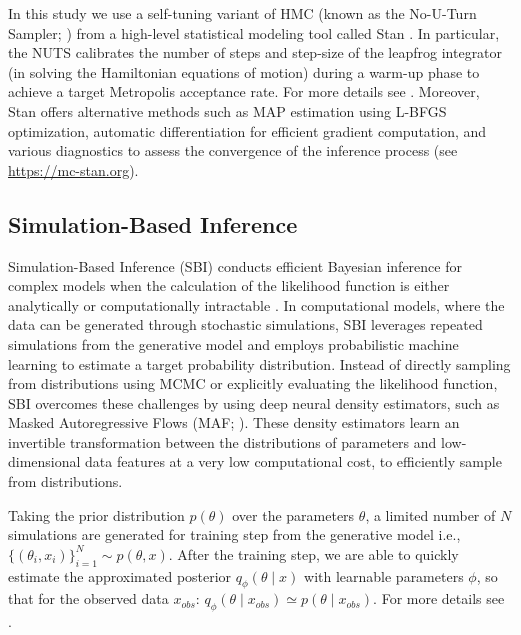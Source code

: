 \documentclass[preprint,11pt,authoryear]{elsarticle}
\begin{document}
In this study we use a self-tuning variant of HMC (known as the No-U-Turn Sampler; \cite{Hoffman2014}) from a high-level statistical modeling tool called Stan \citep{Carpenter2017}.
In particular, the NUTS calibrates the number of steps and step-size of the leapfrog integrator (in solving the Hamiltonian equations of motion) during a warm-up phase to achieve a target Metropolis acceptance rate. For more details see \cite{Betancourt2013, Baldy2023}. Moreover, Stan offers alternative methods such as MAP estimation using L-BFGS optimization, automatic differentiation for efficient gradient computation, and various diagnostics to assess the convergence of the inference process (see \url{https://mc-stan.org}). 



\subsection{Simulation-Based Inference}

Simulation-Based Inference (SBI) conducts efficient Bayesian inference for complex models when the calculation of the likelihood function is either analytically or computationally intractable \citep{Cranmer2020, Brehmer2021}.
In computational models, where the data can be generated through stochastic simulations, SBI leverages repeated simulations from the generative model and employs probabilistic machine learning to estimate a target probability distribution. Instead of directly sampling from distributions using MCMC or explicitly evaluating the likelihood function, SBI overcomes these challenges by using deep neural density estimators, such as Masked Autoregressive Flows (MAF; \cite{Papamakarios2017}).  These density estimators learn an invertible transformation between the distributions of parameters and low-dimensional data features at a very low computational cost, to efficiently sample from distributions. 

Taking the prior distribution $p(\theta)$ over the parameters $\theta$, a limited number of $N$ simulations are generated for training step from the generative model i.e.,  $\{(\theta_i, x_i)\}_{i=1}^{N} \sim p(\theta, x)$. After the training step, we are able to quickly estimate the approximated posterior $q_{\phi}(\theta \mid x)$ with learnable parameters $\phi$, so that for the observed data $x_{obs}$: $q_{\phi}(\theta \mid x_{obs}) \simeq p(\theta \mid x_{obs})$. For more details see \cite{Goncalves2020, Hashemi2023}. 
\end{document}
